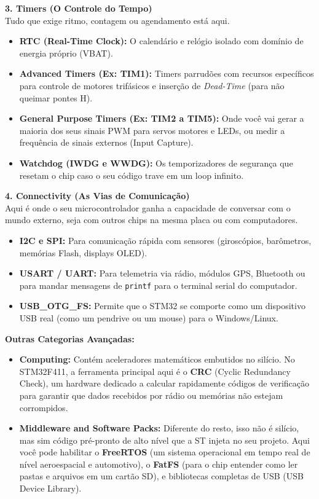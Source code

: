 \documentclass[12pt,a4paper]{article}
\begin{document}
\textbf{3. Timers (O Controle do Tempo)}\\
Tudo que exige ritmo, contagem ou agendamento está aqui.
\begin{itemize}
    \item \textbf{RTC (Real-Time Clock):} O calendário e relógio isolado com domínio de energia próprio (VBAT).
    \item \textbf{Advanced Timers (Ex: TIM1):} Timers parrudões com recursos específicos para controle de motores trifásicos e inserção de \textit{Dead-Time} (para não queimar pontes H).
    \item \textbf{General Purpose Timers (Ex: TIM2 a TIM5):} Onde você vai gerar a maioria dos seus sinais PWM para servos motores e LEDs, ou medir a frequência de sinais externos (Input Capture).
    \item \textbf{Watchdog (IWDG e WWDG):} Os temporizadores de segurança que resetam o chip caso o seu código trave em um loop infinito.
\end{itemize}

\textbf{4. Connectivity (As Vias de Comunicação)}\\
Aqui é onde o seu microcontrolador ganha a capacidade de conversar com o mundo externo, seja com outros chips na mesma placa ou com computadores.
\begin{itemize}
    \item \textbf{I2C e SPI:} Para comunicação rápida com sensores (giroscópios, barômetros, memórias Flash, displays OLED).
    \item \textbf{USART / UART:} Para telemetria via rádio, módulos GPS, Bluetooth ou para mandar mensagens de \texttt{printf} para o terminal serial do computador.
    \item \textbf{USB\_OTG\_FS:} Permite que o STM32 se comporte como um dispositivo USB real (como um pendrive ou um mouse) para o Windows/Linux.
\end{itemize}

\textbf{Outras Categorias Avançadas:}
\begin{itemize}
    \item \textbf{Computing:} Contém aceleradores matemáticos embutidos no silício. No STM32F411, a ferramenta principal aqui é o \textbf{CRC} (Cyclic Redundancy Check), um hardware dedicado a calcular rapidamente códigos de verificação para garantir que dados recebidos por rádio ou memórias não estejam corrompidos.
    \item \textbf{Middleware and Software Packs:} Diferente do resto, isso não é silício, mas sim código pré-pronto de alto nível que a ST injeta no seu projeto. Aqui você pode habilitar o \textbf{FreeRTOS} (um sistema operacional em tempo real de nível aeroespacial e automotivo), o \textbf{FatFS} (para o chip entender como ler pastas e arquivos em um cartão SD), e bibliotecas completas de USB (USB Device Library).
\end{itemize}
\end{document}
